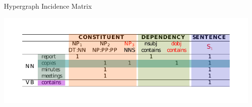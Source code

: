 \documentclass[10pt,=table]{beamer}
\begin{document}
\begin{frame}{Hypergraph Incidence Matrix}
\begin{center}
\includegraphics[width=1\linewidth]{img/incidence_aug.pdf}
\end{center}

\end{frame} 
\end{document}
